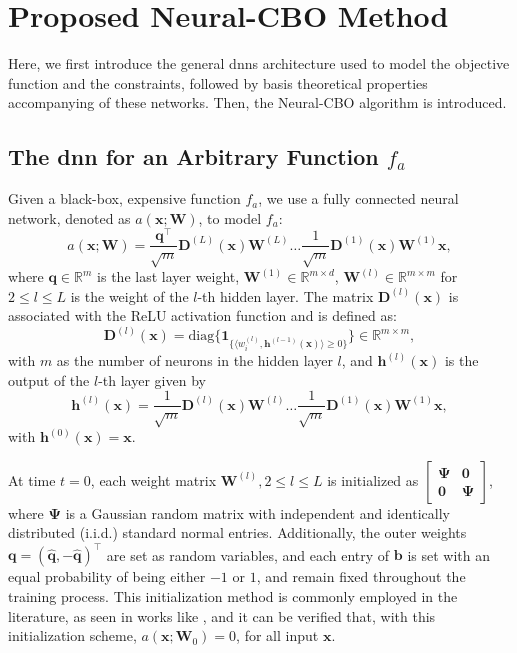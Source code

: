 \section{Proposed Neural-CBO Method}
\label{section:neural-cbo}
Here, we first introduce the general \acp{dnn} architecture used to model the objective function and the constraints, followed by basis theoretical properties accompanying of these networks. Then, the Neural-CBO algorithm is introduced. 

\subsection{The \acl{dnn} for an Arbitrary Function $f_a$}
\label{section:neural-cbo_arbitrary_nn}
Given a black-box, expensive function $f_a$, we use a fully connected neural network, denoted as $a(\mathbf{x}; \mathbf{W})$, to model $f_a$:
\begin{equation}
\label{eqn:fcn}
    a(\mathbf{x}; \mathbf{W}) = \frac{\mathbf{q}^\top}{\sqrt{m}} \mathbf{D}^{(L)}(\mathbf{x}) \mathbf{W}^{(L)} \dots \frac{1}{\sqrt{m}} \mathbf{D}^{(1)}(\mathbf{x}) \mathbf{W}^{(1)} \mathbf{x}, 
\end{equation}
where $\mathbf{q} \in \mathbb{R}^m$ is the last layer weight, $\mathbf{W}^{(1)} \in \mathbb{R}^{m \times d}$, $\mathbf{W}^{(l)} \in \mathbb{R}^{m \times m}$ for $2 \leq l \leq L$ is the weight of the $l$-th hidden layer. The matrix $\mathbf{D}^{(l)}(\mathbf{x})$ is associated with the ReLU activation function and is defined as:
\begin{equation*}
    \mathbf{D}^{(l)}(\mathbf{x}) = \text{diag}\{\mathbf{1}_{ \{ \langle w_i^{(l)}, \mathbf{h}^{(l-1)}(\mathbf{x})  \rangle \ge 0 \} } \} \in \mathbb{R}^{m \times m},
\end{equation*}
with $m$ as the number of neurons in the hidden layer $l$, and $\mathbf{h}^{(l)}(\mathbf{x})$ is the output of the $l$-th layer given by 
\begin{equation*}
    \mathbf{h}^{(l)}(\mathbf{x}) = \frac{1}{\sqrt{m}} \mathbf{D}^{(l)}(\mathbf{x}) \mathbf{W}^{(l)} \dots \frac{1}{\sqrt{m}} \mathbf{D}^{(1)}(\mathbf{x}) \mathbf{W}^{(1)} \mathbf{x},
\end{equation*}
with $\mathbf{h}^{(0)}(\mathbf{x}) = \mathbf{x}$. 

At time $t=0$, each weight matrix $\mathbf{W}^{(l)},  2 \le l \le L$ is initialized as $\begin{bmatrix}
\boldsymbol{\Psi} & \mathbf{0}  \\
\mathbf{0} & \boldsymbol{\Psi}
\end{bmatrix}
$, where $\boldsymbol{\Psi}$ is a Gaussian random matrix with independent and identically distributed (i.i.d.) standard normal entries. Additionally, the outer weights $\mathbf{q} = (\hat{\mathbf{q}}, -\hat{\mathbf{q}})^\top$  are set as random variables, and each entry of $\mathbf{b}$ is set with an equal probability of being either $-1$ or $1$, and remain fixed throughout the training process. This initialization method is commonly employed in the literature, as seen in works like \citet{du2018gradient, arora2019fine}, and it
can be verified that, with this initialization scheme, $a(\mathbf{x}; \mathbf{W}_0) = 0$, for all input $\mathbf{x}$. 


